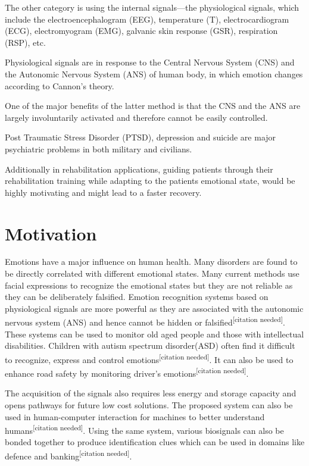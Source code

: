 \documentclass[11pt]{article}
\theoremstyle{definition}
\begin{document}
    The other category is using the internal signals—the physiological signals, which include the electroencephalogram (EEG), temperature (T), electrocardiogram (ECG), electromyogram (EMG), galvanic skin response (GSR), respiration (RSP), etc. 

    Physiological signals are in response to the Central Nervous System (CNS) and the Autonomic Nervous System (ANS) of human body, in which emotion changes according to Cannon’s theory\cite{cannon_james-lange_1927}.

    One of the major benefits of the latter method is that the CNS and the ANS are largely involuntarily activated and therefore cannot be easily controlled.

    Post Traumatic Stress Disorder (PTSD), depression and suicide are major psychiatric problems in both military and civilians.\cite{bryan_combat_2013, tarrier_suicide_2004}
    
    Additionally in rehabilitation applications, guiding patients through their rehabilitation training while adapting to the patients emotional state, would be highly motivating and might lead to a faster recovery.\cite{evans_positive_2011}

  \section{Motivation}
    Emotions have a major influence on human health. 
    Many disorders are found to be directly correlated with different emotional states.
    Many current methods use facial expressions to recognize the emotional states but they are not reliable as they can be deliberately falsified. Emotion recognition systems based on physiological signals are more powerful as they are associated with the autonomic nervous system (ANS) and hence cannot be hidden or falsified\textsuperscript{[citation needed]}. These systems can be used to monitor old aged people and those with intellectual disabilities. Children with autism spectrum disorder(ASD) often find it difficult to recognize, express and control emotions\textsuperscript{[citation needed]}.
    It can also be used to enhance road safety by monitoring driver's emotions\textsuperscript{[citation needed]}. 

    The acquisition of the signals also requires less energy and storage capacity and opens pathways for future low cost solutions. The proposed system can also be used in human-computer interaction for machines to better understand humans\textsuperscript{[citation needed]}. Using the same system, various biosignals can also be bonded together to produce identification clues which can be used in domains like defence and banking\textsuperscript{[citation needed]}.
\end{document}
